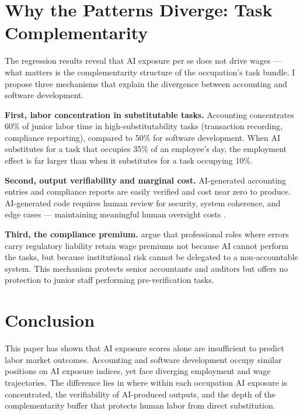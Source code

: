 \documentclass[12pt]{article}
\begin{document}
\section{Why the Patterns Diverge: Task Complementarity}

The regression results reveal that AI exposure per se does not drive 
wages --- what matters is the complementarity structure of the 
occupation's task bundle. I propose three mechanisms that explain 
the divergence between accounting and software development.

\textbf{First, labor concentration in substitutable tasks.} 
Accounting concentrates 60\% of junior labor time in 
high-substitutability tasks (transaction recording, compliance 
reporting), compared to 50\% for software development. When AI 
substitutes for a task that occupies 35\% of an employee's day, 
the employment effect is far larger than when it substitutes for a 
task occupying 10\%.

\textbf{Second, output verifiability and marginal cost.} 
AI-generated accounting entries and compliance reports are easily 
verified and cost near zero to produce. AI-generated code requires 
human review for security, system coherence, and edge cases --- 
maintaining meaningful human oversight costs \citep{seethamraju2025}.

\textbf{Third, the compliance premium.} \citet{gao2026} argue that 
professional roles where errors carry regulatory liability retain 
wage premiums not because AI cannot perform the tasks, but because 
institutional risk cannot be delegated to a non-accountable system. 
This mechanism protects senior accountants and auditors but offers 
no protection to junior staff performing pre-verification tasks.

\section{Conclusion}

This paper has shown that AI exposure scores alone are insufficient 
to predict labor market outcomes. Accounting and software development 
occupy similar positions on AI exposure indices, yet face diverging 
employment and wage trajectories. The difference lies in where within 
each occupation AI exposure is concentrated, the verifiability of 
AI-produced outputs, and the depth of the complementarity buffer 
that protects human labor from direct substitution.
\end{document}
